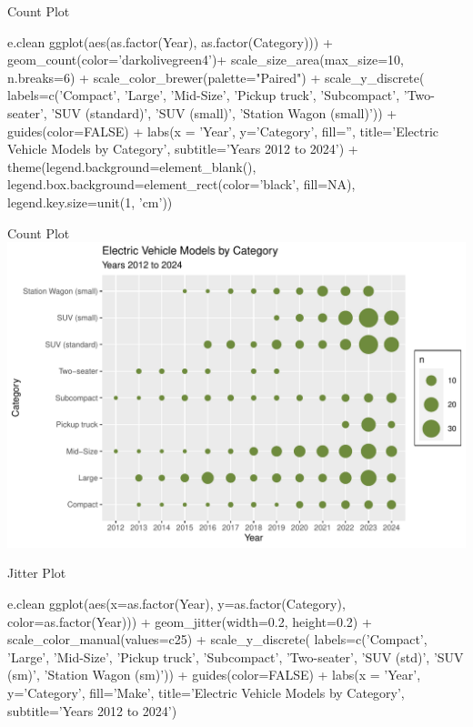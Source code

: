 \documentclass[ignorenonframetext,xcolor=x11names]{beamer}
\begin{document}
\begin{frame}[fragile]{Count Plot}
\scriptsize
\begin{Rcode}
e.clean %
  ggplot(aes(as.factor(Year), as.factor(Category))) +
    geom_count(color='darkolivegreen4')+
    scale_size_area(max_size=10, n.breaks=6) + 
    scale_color_brewer(palette="Paired") +
    scale_y_discrete(
      labels=c('Compact', 'Large', 'Mid-Size', 'Pickup truck', 
               'Subcompact', 'Two-seater', 'SUV (standard)', 
               'SUV (small)', 'Station Wagon (small)')) + 
    guides(color=FALSE) +
    labs(x = 'Year',
         y='Category', 
         fill='', 
         title='Electric Vehicle Models by Category', 
         subtitle='Years 2012 to 2024') +
    theme(legend.background=element_blank(), 
          legend.box.background=element_rect(color='black', 
                                             fill=NA),
          legend.key.size=unit(1, 'cm'))
\end{Rcode}
\end{frame}

\begin{frame}{Count Plot}
  \includegraphics[width=\textwidth]{fuel.count.pdf}
\end{frame}

\begin{frame}[fragile]{Jitter Plot}
\footnotesize
\begin{Rcode}
e.clean %
  ggplot(aes(x=as.factor(Year), 
             y=as.factor(Category), 
             color=as.factor(Year))) +
    geom_jitter(width=0.2, height=0.2) +
    scale_color_manual(values=c25) +
    scale_y_discrete(
      labels=c('Compact', 'Large', 'Mid-Size', 
               'Pickup truck', 'Subcompact',
               'Two-seater', 'SUV (std)', 
               'SUV (sm)', 'Station Wagon (sm)')) + 
    guides(color=FALSE) +
    labs(x = 'Year', 
         y='Category', 
         fill='Make', 
         title='Electric Vehicle Models by Category', 
         subtitle='Years 2012 to 2024')
\end{Rcode}
\end{frame}
\end{document}
